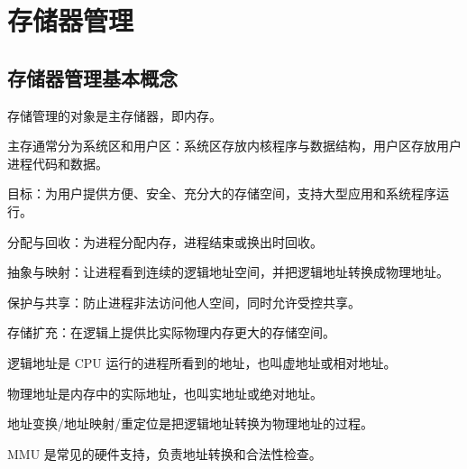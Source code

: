 \chapter{存储器管理}

\section{存储器管理基本概念}
\begin{points}
  \item 存储管理的对象是主存储器，即内存。
  \item 主存通常分为系统区和用户区：系统区存放内核程序与数据结构，用户区存放用户进程代码和数据。
  \item 目标：为用户提供方便、安全、充分大的存储空间，支持大型应用和系统程序运行。
\end{points}


\begin{points}
  \item 分配与回收：为进程分配内存，进程结束或换出时回收。
  \item 抽象与映射：让进程看到连续的逻辑地址空间，并把逻辑地址转换成物理地址。
  \item 保护与共享：防止进程非法访问他人空间，同时允许受控共享。
  \item 存储扩充：在逻辑上提供比实际物理内存更大的存储空间。
\end{points}


\begin{points}
  \item 逻辑地址是 CPU 运行的进程所看到的地址，也叫虚地址或相对地址。
  \item 物理地址是内存中的实际地址，也叫实地址或绝对地址。
  \item 地址变换/地址映射/重定位是把逻辑地址转换为物理地址的过程。
  \item MMU 是常见的硬件支持，负责地址转换和合法性检查。
\end{points}


